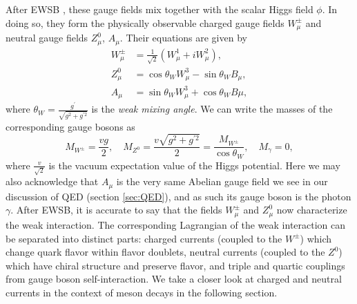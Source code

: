 After EWSB \cite{PhysRevLett.13.508, PhysRevLett.19.1264, salam1968weak}, these gauge fields mix together with the scalar Higgs field $\phi$.  In doing so, they form the physically observable charged gauge fields $W^\pm_\mu$ and neutral gauge fields $Z^0_\mu$, $A_\mu$.  Their equations are given by 
\begin{equation}
\begin{split}
    W^\pm_\mu &= \frac{1}{\sqrt{2}}(W^1_\mu + iW_\mu^2),\\
    Z^0_\mu &= \cos\theta_W W_μ^3 − \sin\theta_W B_\mu,\\
    A_\mu &= \sin\theta_W W_μ^3 + \cos\theta_W Bμ,
\end{split}
\end{equation}
where $\theta_W = \frac{g^\prime}{\sqrt{g^2+g^{\prime2}}}$ is the \textit{weak mixing angle}.  We can write the masses of the corresponding gauge bosons as
\begin{equation}\label{eq:boson_masses}
    M_{W^\pm} = \frac{vg}{2}, \quad M_{Z^0} = \frac{v\sqrt{g^2+g^{\prime2}}}{2} = \frac{M_{W^\pm}}{\cos\theta_W}, \quad M_\gamma = 0,
\end{equation}
where $\frac{v}{\sqrt{2}}$ is the vacuum expectation value of the Higgs potential. Here we may also acknowledge that $A_\mu$ is the very same Abelian gauge field we see in our discussion of QED (section \ref{sec:QED}), and as such its gauge boson is the photon $\gamma$.  After EWSB, it is accurate to say that the fields $W^\pm_\mu$ and $Z^0_\mu$ now characterize the weak interaction.  The corresponding Lagrangian of the weak interaction can be separated into distinct parts: charged currents (coupled to the $W^\pm$) which change quark flavor within flavor doublets, neutral currents (coupled to the $Z^0$) which have chiral structure and preserve flavor, and triple and quartic couplings from gauge boson self-interaction.  We take a closer look at charged and neutral currents in the context of meson decays in the following section.  

